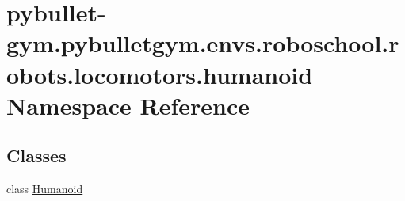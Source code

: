 \hypertarget{namespacepybullet-gym_1_1pybulletgym_1_1envs_1_1roboschool_1_1robots_1_1locomotors_1_1humanoid}{}\section{pybullet-\/gym.pybulletgym.\+envs.\+roboschool.\+robots.\+locomotors.\+humanoid Namespace Reference}
\label{namespacepybullet-gym_1_1pybulletgym_1_1envs_1_1roboschool_1_1robots_1_1locomotors_1_1humanoid}
\subsection*{Classes}
\begin{DoxyCompactItemize}
\item 
class \hyperlink{classpybullet-gym_1_1pybulletgym_1_1envs_1_1roboschool_1_1robots_1_1locomotors_1_1humanoid_1_1_humanoid}{Humanoid}
\end{DoxyCompactItemize}
